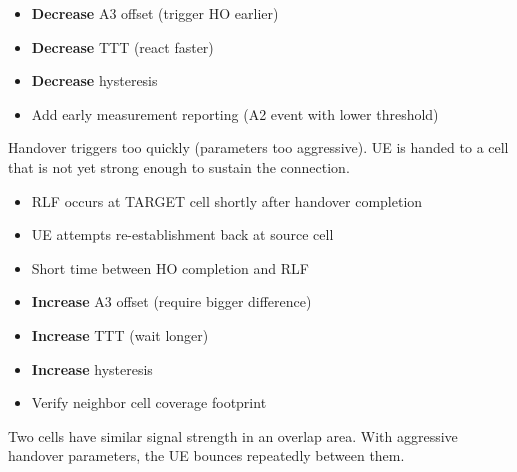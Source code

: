 \begin{itemize}
\tightlist
\item
  \textbf{Decrease} A3 offset (trigger HO earlier)
\item
  \textbf{Decrease} TTT (react faster)
\item
  \textbf{Decrease} hysteresis
\item
  Add early measurement reporting (A2 event with lower threshold)
\end{itemize}



\CNchained{}

Handover triggers too quickly (parameters too aggressive). UE is handed to a cell that is not yet strong enough to sustain the connection.





\begin{itemize}
\tightlist
\item
  RLF occurs at TARGET cell shortly after handover completion
\item
  UE attempts re-establishment back at source cell
\item
  Short time between HO completion and RLF
\end{itemize}


\begin{itemize}
\tightlist
\item
  \textbf{Increase} A3 offset (require bigger difference)
\item
  \textbf{Increase} TTT (wait longer)
\item
  \textbf{Increase} hysteresis
\item
  Verify neighbor cell coverage footprint
\end{itemize}



\CNchained{}

Two cells have similar signal strength in an overlap area. With aggressive handover parameters, the UE bounces repeatedly between them.

